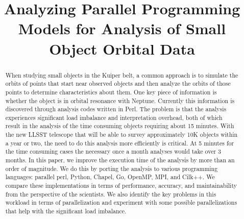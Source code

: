 \documentclass[conference]{IEEEtran}
\begin{document}
\title{Analyzing Parallel Programming Models for Analysis of Small Object Orbital Data}


\author{
\and
{}
}

\maketitle

\begin{abstract}
When studying small objects in the Kuiper belt, a common approach is to simulate the orbits
of points that start near observed objects and then analyze the orbits of those points to determine
characteristics about them.  One key piece of information is whether the object is in orbital resonance
with Neptune.  Currently this information is discovered through analysis codes written
in Perl.  The problem is that the analysis experiences significant load imbalance and interpretation
overhead, both of which result in the analysis of the time consuming objects requiring
about 15 minutes.  With the new LLSST telescope that will be able
to survey approximately 10K objects within a year or two, the need to do this analysis
more efficiently is critical.
At 5 minutes for the time consuming cases the necessary once a month analyses would
 take over 3 months.
In this paper, we improve the execution time of the analysis by more than an order of 
magnitude.  We do this by porting the analysis to various programming languages:
parallel perl, Python, Chapel, Go, OpenMP, MPI, and Cilk++.
We compare these implementations in terms of performance, accuracy,
and maintainability from the perspective of the scientists.  We also
identify the key problems in this workload in terms of parallelization and
experiment with some possible parallelizations that help with the 
significant load imbalance.
\end{abstract}
\end{document}
